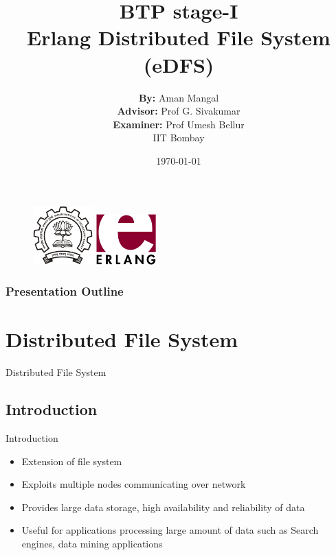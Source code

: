 \documentclass{beamer}
\title[Erlang Distributed File System (eDFS)]
{
	BTP stage-I \\
	Erlang Distributed File System (eDFS)
}
\author[Aman Mangal \\ (IIT Bombay)]
{	\sffamily
	\textbf{By:} Aman Mangal \\
	\textbf{Advisor:} Prof G. Sivakumar \\
	\textbf{Examiner:} Prof Umesh Bellur \\
	IIT Bombay
}
\date{\today}
\begin{document}
\begin{frame}
\addtocounter{framenumber}{-1}
\begin{figure}
    \includegraphics[width=2.3cm]{images/iitb}
    \hspace*{0.8cm}
    \includegraphics[width=2.3cm]{images/erlang}
\end{figure}
\titlepage
\end{frame}

\begin{frame}\frametitle{Presentation Outline}
\tableofcontents
\end{frame}


\section{Distributed File System}
\begin{frame}{Distributed File System}
\addtocounter{framenumber}{-1}
\tableofcontents[currentsection]
\end{frame}

\subsection{Introduction}
\begin{frame}{Introduction}
\begin{itemize}
\item Extension of file system
\item Exploits multiple nodes communicating over network
\item Provides large data storage, high availability and reliability of data
\item Useful for applications processing large amount of data such as Search engines, data mining applications
\end{itemize}
\end{frame}
\end{document}
